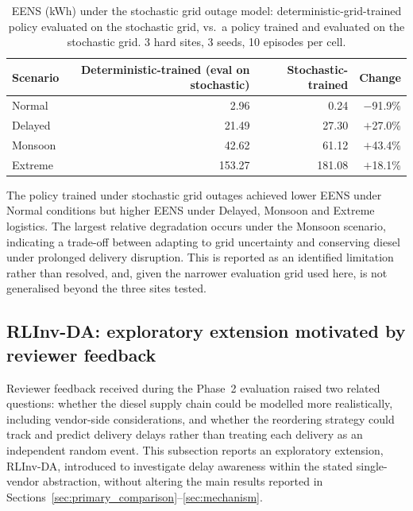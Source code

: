 \begin{table}[htb]
\centering
\caption{EENS (kWh) under the stochastic grid outage model:
deterministic-grid-trained policy evaluated on the stochastic grid,
vs.\ a policy trained and evaluated on the stochastic grid. 3 hard
sites, 3 seeds, 10 episodes per cell.}
\label{tab:stochastic_grid}
\begin{tabular}{lrrr}
\toprule
Scenario & Deterministic-trained (eval on stochastic) & Stochastic-trained & Change \\
\midrule
Normal & 2.96 & 0.24 & $-$91.9\% \\
Delayed & 21.49 & 27.30 & $+$27.0\% \\
Monsoon & 42.62 & 61.12 & $+$43.4\% \\
Extreme & 153.27 & 181.08 & $+$18.1\% \\
\bottomrule
\end{tabular}
\end{table}

The policy trained under stochastic grid outages achieved lower EENS
under Normal conditions but higher EENS under Delayed, Monsoon and
Extreme logistics. The largest relative degradation
occurs under the Monsoon scenario, indicating a trade-off between
adapting to grid uncertainty and conserving diesel under prolonged
delivery disruption. This is reported as an identified limitation
rather than resolved, and, given the narrower evaluation grid used
here, is not generalised beyond the three sites tested.

\subsection{RLInv-DA: exploratory extension motivated by reviewer feedback}
\label{sec:rlinv_da}

Reviewer feedback received during the Phase~2 evaluation raised two
related questions: whether the diesel supply chain could be modelled
more realistically, including vendor-side considerations, and whether
the reordering strategy could track and
predict delivery delays rather than treating each delivery as an
independent random event. This subsection reports an
exploratory extension, RLInv-DA, introduced to investigate delay
awareness within the stated single-vendor abstraction, without altering the main
results reported in Sections~\ref{sec:primary_comparison}--\ref{sec:mechanism}.

